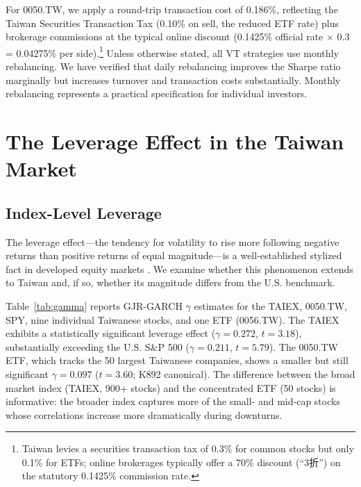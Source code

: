 For 0050.TW, we apply a round-trip transaction cost of 0.186\%, reflecting the Taiwan Securities Transaction Tax (0.10\% on sell, the reduced ETF rate) plus brokerage commissions at the typical online discount (0.1425\% official rate $\times$ 0.3 = 0.04275\% per side).\footnote{Taiwan levies a securities transaction tax of 0.3\% for common stocks but only 0.1\% for ETFs; online brokerages typically offer a 70\% discount (``3折'') on the statutory 0.1425\% commission rate.} Unless otherwise stated, all VT strategies use monthly rebalancing. We have verified that daily rebalancing improves the Sharpe ratio marginally but increases turnover and transaction costs substantially. Monthly rebalancing represents a practical specification for individual investors.



\section{The Leverage Effect in the Taiwan Market}
\label{sec:leverage}

\subsection{Index-Level Leverage}

The leverage effect---the tendency for volatility to rise more following negative returns than positive returns of equal magnitude---is a well-established stylized fact in developed equity markets \citep{black1976,christie1982,nelson1991,glosten1993}. We examine whether this phenomenon extends to Taiwan and, if so, whether its magnitude differs from the U.S. benchmark.

Table~\ref{tab:gamma} reports GJR-GARCH $\gamma$ estimates for the TAIEX, 0050.TW, SPY, nine individual Taiwanese stocks, and one ETF (0056.TW). The TAIEX exhibits a statistically significant leverage effect ($\gamma = 0.272$, $t = 3.18$), substantially exceeding the U.S. S\&P 500 ($\gamma = 0.211$, $t = 5.79$). The 0050.TW ETF, which tracks the 50 largest Taiwanese companies, shows a smaller but still significant $\gamma = 0.097$ ($t = 3.60$; K892 canonical). The difference between the broad market index (TAIEX, 900+ stocks) and the concentrated ETF (50 stocks) is informative: the broader index captures more of the small- and mid-cap stocks whose correlations increase more dramatically during downturns.

